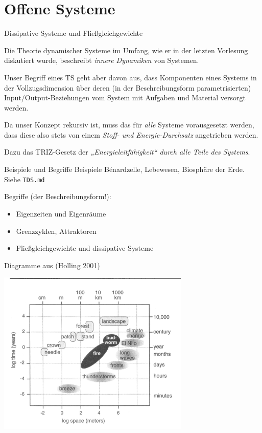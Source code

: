 \documentclass{beamer}
\title{Modellierung nachhaltiger Systeme\\ und Semantic Web\\[6pt] \Large
  Entwicklung von Systemen\\ und ihren Komponenten
  \vskip1em}
\subtitle{Vorlesung im Modul 10-202-2330\\ im Master und Lehramt Informatik\\
  sowie im Modul 10-202-2309 im Master Informatik}
\author{Prof. Dr. Hans-Gert Gräbe\\
\url{http://www.informatik.uni-leipzig.de/~graebe}}
\date{Wintersemester 2020/21}
\begin{document}
{
\begin{frame}
  \titlepage
\end{frame}}

\section{Offene Systeme}
\begin{frame}{Dissipative Systeme und Fließgleichgewichte}

  Die Theorie dynamischer Systeme im Umfang, wie er in der letzten Vorlesung
  diskutiert wurde, beschreibt \emph{innere Dynamiken} von Systemen.

  Unser Begriff eines TS geht aber davon aus, dass Komponenten eines Systems
  in der Vollzugsdimension über deren (in der Beschreibungsform
  parametrisierten) Input/Output-Beziehungen vom System mit Aufgaben und
  Material versorgt werden.

  Da unser Konzept rekursiv ist, muss das für \emph{alle} Systeme
  vorausgesetzt werden, dass diese also stets von einem \emph{Stoff- und
    Energie-Durchsatz} angetrieben werden.

  Dazu das TRIZ-Gesetz der \emph{„Energieleitfähigkeit“ durch alle Teile des
    Systems}.
\end{frame}

\begin{frame}{Beispiele und Begriffe}
  Beispiele Bénardzelle, Lebewesen, Biosphäre der Erde.  Siehe \texttt{TDS.md}

  Begriffe (der Beschreibungsform!): 
  \begin{itemize}
  \item Eigenzeiten und Eigenräume
  \item Grenzzyklen, Attraktoren
  \item Fließgleichgewichte und dissipative Systeme
  \end{itemize}
\end{frame}

\begin{frame}{Diagramme aus (Holling 2001)}
  \begin{center}
    \includegraphics[width=.75\textwidth]{Holling-1.png}
  \end{center}
\end{frame}
\end{document}
